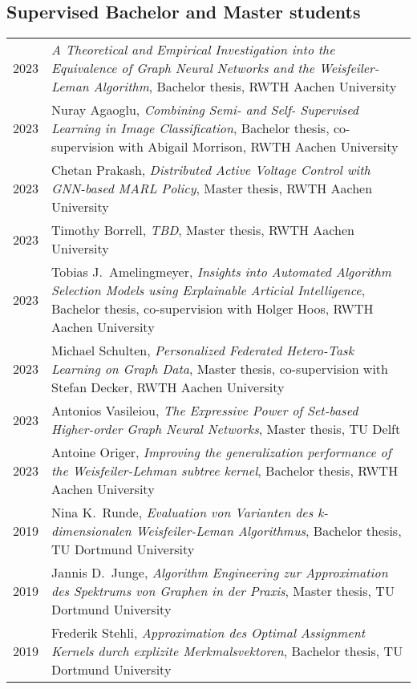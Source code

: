 \documentclass[10pt, a4paper, DIV=14, headings=small]{scrartcl}
\begin{document}
\subsection*{Supervised Bachelor and Master students}
\begin{longtabu}{p{2.1cm}p{12.0cm}}
	2023 & \emph{A Theoretical and Empirical Investigation into the Equivalence of Graph Neural Networks and the Weisfeiler-Leman Algorithm}, Bachelor thesis, RWTH Aachen University                                                     \\
	2023 & Nuray Agaoglu, \emph{Combining Semi- and Self- Supervised Learning in Image Classification}, Bachelor thesis, co-supervision with Abigail Morrison, RWTH Aachen University\\  
	2023 & Chetan Prakash, \emph{Distributed Active Voltage Control with GNN-based MARL Policy}, Master thesis, RWTH Aachen University\\  
	2023 & Timothy Borrell, \emph{TBD}, Master thesis, RWTH Aachen University\\
	2023 & Tobias J.\ Amelingmeyer, \emph{Insights into Automated Algorithm Selection Models using Explainable Articial Intelligence}, Bachelor thesis, co-supervision with Holger Hoos, RWTH Aachen University \\
	2023 & Michael Schulten, \emph{Personalized Federated Hetero-Task Learning on Graph Data}, Master thesis, co-supervision with Stefan Decker, RWTH Aachen University                                         \\
	2023 & Antonios Vasileiou, \emph{The Expressive Power of Set-based Higher-order Graph Neural Networks}, Master thesis, TU Delft                                                                             \\
	2023 & Antoine Origer, \emph{Improving the generalization performance of the Weisfeiler-Lehman subtree kernel}, Bachelor thesis, RWTH Aachen University                                                     \\
	2019 & Nina K.\ Runde, \emph{Evaluation von Varianten des k-dimensionalen Weisfeiler-Leman Algorithmus}, Bachelor thesis, TU Dortmund University                                                            \\
	2019 & Jannis D.\ Junge, \emph{Algorithm Engineering zur Approximation des Spektrums von Graphen in der Praxis}, Master thesis, TU Dortmund University                                                      \\
	2019 & Frederik Stehli, \emph{Approximation des Optimal Assignment Kernels durch explizite Merkmalsvektoren}, Bachelor thesis, TU Dortmund University                                                       \\

\end{longtabu}
\end{document}
